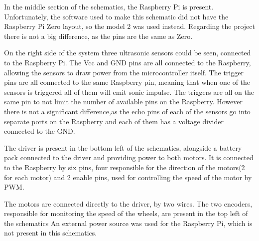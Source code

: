 In the middle section of the schematics, the Raspberry Pi is present. Unfortunately, the software used to make this schematic did not have the Raspberry Pi Zero layout, so the model 2 was used instead. Regarding the project there is not a big difference, as the pins are the same as Zero.

On the right side of the system three ultrasonic sensors could be seen, connected to the Raspberry Pi. The Vcc and GND pins are all connected to the Raspberry, allowing the sensors to draw power from the microcontroller itself. The trigger pins are all connected to the same Raspberry pin, meaning that when one of the sensors is triggered all of them will emit sonic impulse.
The triggers are all on the same pin to not limit the number of available pins on the Raspberry. However there is not a significant difference,as the echo pins of each of the sensors go into separate ports on the Raspberry and each of them has a voltage divider connected to the GND.

The driver is present in the bottom left of the schematics, alongside a battery pack connected to the driver and providing power to both motors. It is connected to the Raspberry by six pins, four responsible for the direction of the motors(2 for each motor) and 2 enable pins, used for controlling the speed of the motor by PWM.

\newpage
The motors are connected directly to the driver, by two wires.
The two encoders, responsible for monitoring the speed of the wheels, are present in the top left of the schematics
An external power source was used for the Raspberry Pi, which is not present in this schematics.


